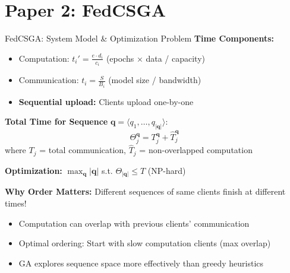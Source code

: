 \documentclass{beamer}
\begin{document}
\section{Paper 2: FedCSGA}

\begin{frame}{FedCSGA: System Model \& Optimization Problem}
\textbf{Time Components:}
\begin{itemize}
\item Computation: $t_i' = \frac{e \cdot d_i}{c_i}$ (epochs × data / capacity)
\item Communication: $t_i = \frac{S}{B_i}$ (model size / bandwidth)
\item \textbf{Sequential upload:} Clients upload one-by-one
\end{itemize}

\textbf{Total Time for Sequence} $\mathbf{q} = \langle q_1, \ldots, q_{|\mathbf{q}|} \rangle$:
\begin{equation}
\Theta_j^{\mathbf{q}} = T_j^{\mathbf{q}} + \widehat{T}_j^{\mathbf{q}}
\end{equation}
where $T_j$ = total communication, $\widehat{T}_j$ = non-overlapped computation

\textbf{Optimization:} $\max_{\mathbf{q}} |\mathbf{q}|$ s.t. $\Theta_{|\mathbf{q}|} \leq T$ (NP-hard)

\vspace{0.2cm}
\textbf{Why Order Matters:} Different sequences of same clients finish at different times!
\begin{itemize}
\item Computation can overlap with previous clients' communication
\item Optimal ordering: Start with slow computation clients (max overlap)
\item GA explores sequence space more effectively than greedy heuristics
\end{itemize}
\end{frame}
\end{document}

